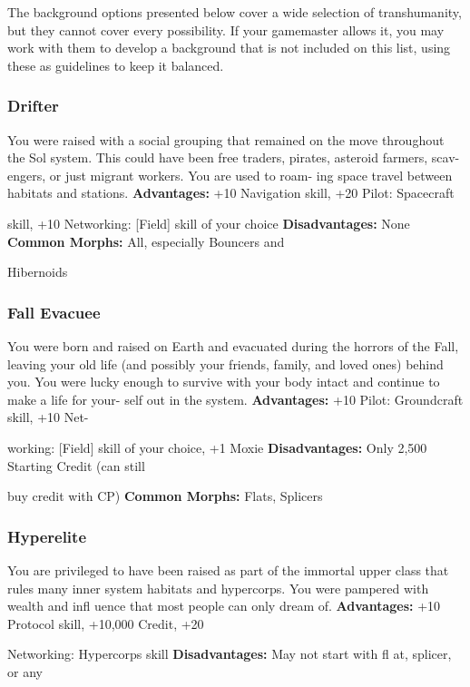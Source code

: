 The background options presented below cover a 
wide selection of transhumanity, but they cannot cover 
every possibility. If your gamemaster allows it, you 
may work with them to develop a background that is 
not included on this list, using these as guidelines to 
keep it balanced.

\subsubsection{Drifter}

You were raised with a social grouping that remained 
on the move throughout the Sol system. This could 
have been free traders, pirates, asteroid farmers, scav-
engers, or just migrant workers. You are used to roam-
ing space travel between habitats and stations.
\textbf{Advantages:} +10 Navigation skill, +20 Pilot: Spacecraft 

skill, +10 Networking: [Field] skill of your choice
\textbf{Disadvantages:} None
\textbf{Common Morphs:} All, especially Bouncers and 

Hibernoids

\subsubsection{Fall Evacuee}

You were born and raised on Earth and evacuated 
during the horrors of the Fall, leaving your old life 
(and possibly your friends, family, and loved ones) 
behind you. You were lucky enough to survive with 
your body intact and continue to make a life for your-
self out in the system.
\textbf{Advantages:  }+10 Pilot: Groundcraft skill, +10 Net-

working: [Field] skill of your choice, +1 Moxie
\textbf{Disadvantages:} Only 2,500 Starting Credit (can still 

buy credit with CP)
\textbf{Common Morphs:} Flats, Splicers

\subsubsection{Hyperelite}

You are privileged to have been raised as part of the 
immortal upper class that rules many inner system 
habitats and hypercorps. You were pampered with 
wealth and infl uence that most people can only 
dream of.
\textbf{Advantages:} +10 Protocol skill, +10,000 Credit, +20 

Networking: Hypercorps skill
\textbf{Disadvantages:} May not start with fl at, splicer, or any 

